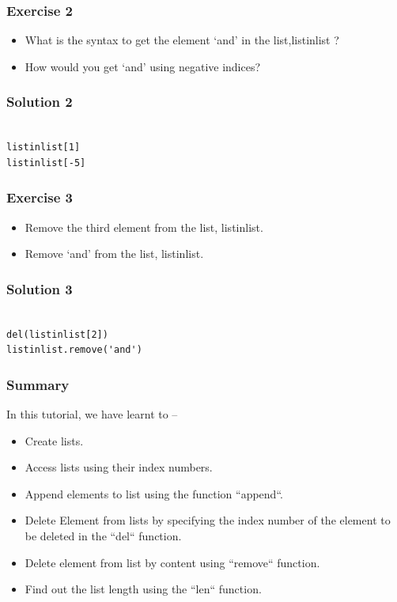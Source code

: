 \documentclass[presentation]{beamer}
\begin{document}
\begin{frame}
\frametitle{Exercise 2}
\label{sec-4}


\begin{itemize}
\item What is the syntax to get the element `and' 
     in the list,listinlist ?
\item How would you get `and' using negative indices?
\end{itemize}
\end{frame}
\begin{frame}[fragile]
\frametitle{Solution 2}
\label{sec-5}

  
\lstset{language=Python}
\begin{lstlisting}

listinlist[1]
listinlist[-5]
\end{lstlisting}
\end{frame}
\begin{frame}
\frametitle{Exercise 3}
\label{sec-6}



\begin{itemize}
\item Remove the third element from the list, listinlist.
\item Remove `and' from the list, listinlist.
\end{itemize}
\end{frame}
\begin{frame}[fragile]
\frametitle{Solution 3}
\label{sec-7}

\lstset{language=Python}
\begin{lstlisting}

del(listinlist[2])
listinlist.remove('and')
\end{lstlisting}
\end{frame}
\begin{frame}
\frametitle{Summary}
\label{sec-8}

  In this tutorial, we have learnt to –

\begin{itemize}
\item Create lists.
\item Access lists using their index numbers.
\item Append elements to list using the function ``append``.
\item Delete Element from lists by specifying the index number of the
    element to be deleted in the ``del`` function.
\item Delete element from list by content using ``remove`` function.
\item Find out the list length using the ``len`` function.
\end{itemize}
\end{frame}
\end{document}
